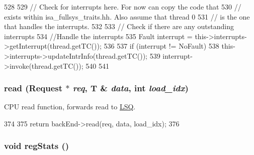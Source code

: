 \begin{DoxyCode}
528 {
529     // Check for interrupts here.  For now can copy the code that
530     // exists within isa_fullsys_traits.hh.  Also assume that thread 0
531     // is the one that handles the interrupts.
532 
533     // Check if there are any outstanding interrupts
534     //Handle the interrupts
535     Fault interrupt = this->interrupts->getInterrupt(thread.getTC());
536 
537     if (interrupt != NoFault) {
538         this->interrupts->updateIntrInfo(thread.getTC());
539         interrupt->invoke(thread.getTC());
540     }
541 }
\end{DoxyCode}
\hypertarget{classOzoneCPU_a114fc97babb72af291378f2d42f0b445}{
\subsubsection[{read}]{ read ({\bf Request} $\ast$ {\em req}, \/  T \& {\em data}, \/  int {\em load\_\-idx})}}
\label{classOzoneCPU_a114fc97babb72af291378f2d42f0b445}
CPU read function, forwards read to \hyperlink{classLSQ}{LSQ}. 


\begin{DoxyCode}
374     {
375         return backEnd->read(req, data, load_idx);
376     }
\end{DoxyCode}
\hypertarget{classOzoneCPU_a4dc637449366fcdfc4e764cdf12d9b11}{
\subsubsection[{regStats}]{\setlength{\rightskip}{0pt plus 5cm}void regStats ()}}
\label{classOzoneCPU_a4dc637449366fcdfc4e764cdf12d9b11}



